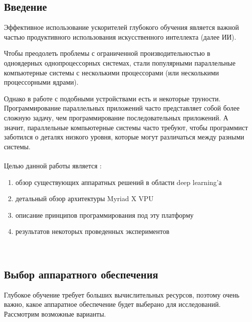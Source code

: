 \documentclass{article}
\begin{document}
    \newpage
    \begin{center} 
    \section{Введение}
    \end{center}
    \large 
    
    Эффективное использование ускорителей глубокого обучения является важной частью продуктивного использования искусственного интеллекта (далее ИИ).
    
    Чтобы преодолеть проблемы с ограниченной производительностью в одноядерных однопроцессорных системах, стали популярными параллельные компьютерные системы с несколькими процессорами (или несколькими процессорными ядрами).
    
    Однако в работе с подобными устройствами есть и некоторые труности. Программирование параллельных приложений часто представляет собой более сложную задачу, чем программирование последовательных приложений. А значит, параллельные компьютерные системы часто требуют, чтобы программист заботился о деталях низкого уровня, которые могут различаться между разными системы.\\ \\
    Целью данной работы является :\\
    \begin{enumerate} 
    \item обзор существующих аппаратных решений в области deep learning'а
    \item детальный обзор архитектуры Myriad X VPU
    \item описание принципов программирования под эту платформу
    \item результатов некоторых проведенных экспериментов
    \end{enumerate} 
    \\
    
    \newpage
    \begin{center} 
    \section{Выбор аппаратного обеспечения}
    \end{center}
    
    Глубокое обучение требует больших вычислительных ресурсов, поэтому очень важно, какое аппаратное обеспечение будет выберано для исследований. Рассмотрим возможные варианты.
    
\end{document}
